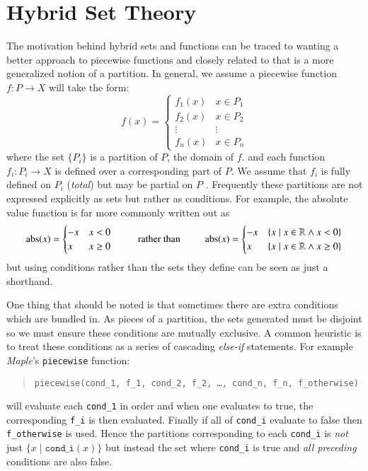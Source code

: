 \chapter{Hybrid Set Theory}


%
%


The motivation behind hybrid sets and functions can be traced to wanting a better approach to piecewise functions
and closely related to that is a more generalized notion of a partition.
In general, we assume a piecewise function $f : P \to X$ will take the form:
\begin{equation}
	\label{eq_fP}
	f(x) = 
	     \begin{cases}
	       f_1(x) & x \in P_1 \\
	       f_2(x) & x \in P_2 \\ 
	       \vdots & \vdots \\
	       f_n(x) & x \in P_n
	     \end{cases}
\end{equation}
where the set $\{ P _ i \}$ is a partition of $P$, the domain of $f$.
and each function $f_i: P_i \to X$ is defined over a corresponding part of $P$. 
We assume that $f_i$ is fully defined on $P_i$ (\emph{total}) but may be partial on $P$ .
Frequently these partitions are not expressed explicitly as sets but rather as conditions.
For example, the absolute value function is far more commonly written out as
\begin{equation*}
	\text{abs}(x) = \begin{cases} -x & x < 0 \\ x & x \geq 0 \end{cases}
	\;\;\;\;\;\;\;\;\;\text{rather than}\;\;\;\;\;\;\;\;\;
	\text{abs}(x) = 
	\begin{cases}
		-x & \{x \;|\; x \in \mathbb{R} \wedge x < 0\}  \\ 
		x & \{x \;|\; x \in \mathbb{R} \wedge x \geq 0 \}
	\end{cases}
\end{equation*}
but using conditions rather than the sets they define can be seen as just a shorthand. 


One thing that should be noted is that sometimes there are extra conditions which are bundled in.
As pieces of a partition, the sets generated must be disjoint so we must ensure these conditions are mutually exclusive.
A common heuristic is to treat these conditions as a series of cascading \emph{else-if} statements.
For example \emph{Maple}'s \texttt{piecewise} function:
\begin{quote}
	\texttt{piecewise(cond\_1, f\_1, cond\_2, f\_2, \ldots, cond\_n, f\_n, f\_otherwise)} 
\end{quote}	
will evaluate each \texttt{cond\_1} in order and when one evaluates to true, the corresponding \texttt{f\_i} is then evaluated.
Finally if all of \texttt{cond\_i} evaluate to false then \texttt{f\_otherwise} is used.
Hence the partitions corresponding to each \texttt{cond\_i} is \emph{not} just $\{ x \;|\; \texttt{cond\_i}(x) \}$
but instead the set where \texttt{cond\_i} is true and \emph{all preceding} conditions are also false.



